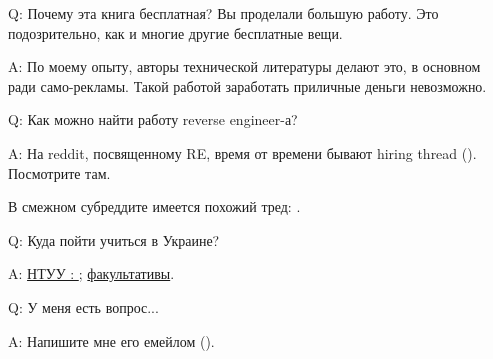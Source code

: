 \par Q: Почему эта книга бесплатная? Вы проделали большую работу. Это подозрительно, как и многие другие бесплатные вещи.
\par A: По моему опыту, авторы технической литературы делают это, в основном ради само-рекламы. Такой работой заработать приличные деньги невозможно.

\par Q: Как можно найти работу reverse engineer-а?
\par A: На reddit, посвященному RE\FNURLREDDIT, время от времени бывают hiring thread (\RedditHiringThread{}).
Посмотрите там.

В смежном субреддите  имеется похожий тред: \NetsecHiringThread{}.

\par Q: Куда пойти учиться в Украине?
\par A: \href{http://go.yurichev.com/17336}{НТУУ : };
\href{http://go.yurichev.com/17337}{факультативы}.

\par Q: У меня есть вопрос...
\par A: Напишите мне его емейлом (\EMAIL).
